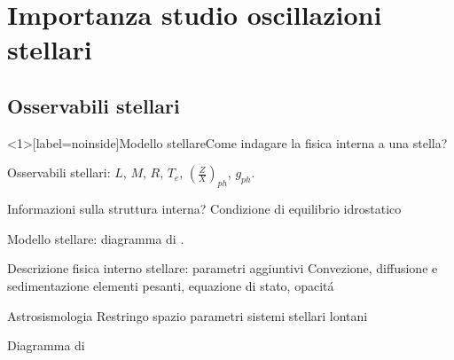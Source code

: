 \section{Importanza studio oscillazioni stellari}

\subsection{Osservabili stellari}

\begin{frame}<1>[label=noinside]{Modello stellare}{Come indagare la fisica interna a una stella?}

\begin{block}{Osservabili stellari:}
$L$, $M$, $R$, $T_e$, $(\frac{Z}{X})_{ph}$, $g_{ph}$.
\end{block}

\begin{block}{Informazioni sulla struttura interna?} Condizione di equilibrio idrostatico
\end{block}


\begin{block}{Modello stellare: diagramma di \hr{}.}
\end{block}

\begin{block}{Descrizione fisica interno stellare: parametri aggiuntivi}
Convezione, diffusione e sedimentazione elementi pesanti, equazione di stato, opacit\'a
\end{block}

\begin{block}{Astrosismologia}
Restringo spazio parametri sistemi stellari lontani
\end{block}

\end{frame}


{ %
    \begin{frame}[plain]{Diagramma di \hr{}}
     \end{frame}
}



